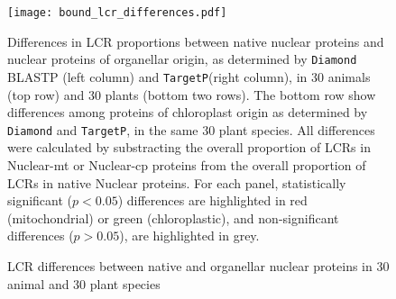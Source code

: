 \documentclass[a4paper,12pt]{article}
\newcommand{\arab}{\mbox{\textit{Arabidopsis\,thaliana}}\xspace}
\newcommand{\oryz}{\mbox{\textit{Oryza\,sativa}}\xspace}
\newcommand{\tget}{\mbox{\texttt{TargetP}}\xspace}
\renewcommand{\diamond}{\mbox{\texttt{Diamond}}\xspace}
\begin{document}
\begin{multicols}{2}
% 

\begin{figure*}
    \caption{LCR differences between native and organellar nuclear
proteins in 30 animal and 30 plant species}
    \label{fig:lcrdifferences}
    \begin{center}
      \texttt{[image: bound\_lcr\_differences.pdf]}
    \end{center} 
    
    \centering\parbox{0.9\textwidth}{\footnotesize Differences in
LCR proportions between native nuclear proteins and nuclear proteins
of organellar origin, as determined by \diamond BLASTP (left column)
and \tget (right column), in 30 animals (top row) and 30 plants
(bottom two rows). The bottom row show differences among proteins of
chloroplast origin as determined by \diamond and \tget, in the same
30 plant species. All differences were calculated by substracting the
overall proportion of LCRs in Nuclear-mt or Nuclear-cp proteins from the
overall proportion of LCRs in native Nuclear proteins. For each panel,
statistically significant ($p < 0.05$) differences are highlighted in red
(mitochondrial) or green (chloroplastic), and non-significant differences
($p > 0.05$), are highlighted in grey.}
\end{figure*}


\end{multicols}
\end{document}
